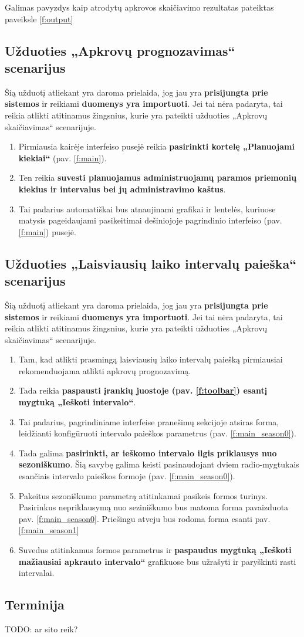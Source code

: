 Galimas pavyzdys kaip atrodytų apkrovos skaičiavimo rezultatas pateiktas paveiksle \ref{f:output}

\subsection{Užduoties „Apkrovų prognozavimas“ scenarijus}
Šią užduotį atliekant yra daroma prielaida, jog jau yra \textbf{prisijungta prie sistemos} ir reikiami \textbf{duomenys yra importuoti}. Jei tai nėra padaryta, tai reikia atlikti atitinamus žingsnius, kurie yra pateikti užduoties „Apkrovų skaičiavimas“ scenarijuje.

\begin{enumerate}
  \item Pirmiausia kairėje interfeiso pusejė reikia \textbf{pasirinkti kortelę „Planuojami kiekiai“} (pav. \ref{f:main}).
  \item Ten reikia \textbf{suvesti planuojamus administruojamų paramos priemonių kiekius ir intervalus bei jų administravimo kaštus}.
  \item Tai padarius automatiškai bus atnaujinami grafikai ir lentelės, kuriuose matysis pageidaujami pasikeitimai dešiniojoje pagrindinio interfeiso (pav. \ref{f:main}) pusejė.
\end{enumerate}


\subsection{Užduoties „Laisviausių laiko intervalų paieška“ scenarijus}
Šią užduotį atliekant yra daroma prielaida, jog jau yra \textbf{prisijungta prie sistemos} ir reikiami \textbf{duomenys yra importuoti}. Jei tai nėra padaryta, tai reikia atlikti atitinamus žingsnius, kurie yra pateikti užduoties „Apkrovų skaičiavimas“ scenarijuje.

\begin{enumerate}
  \item Tam, kad atlikti prasmingą laisviausių laiko intervalų paiešką pirmiausiai rekomenduojama atlikti apkrovų prognozavimą.
  \item Tada reikia \textbf{paspausti įrankių juostoje (pav. \ref{f:toolbar}) esantį mygtuką „Ieškoti intervalo“}.
  \item Tai padarius, pagrindiniame interfeise pranešimų sekcijoje atsiras forma, leidžianti konfigūruoti intervalo paieškos parametrus (pav. \ref{f:main_season0}).
  \item Tada galima \textbf{pasirinkti, ar ieškomo intervalo ilgis priklausys nuo sezoniškumo}. Šią savybę galima keisti pasinaudojant dviem radio-mygtukais esančiais intervalo paieškos formoje (pav. \ref{f:main_season0}).
  \item Pakeitus sezoniškumo parametrą atitinkamai pasikeis formos turinys. Pasirinkus nepriklausymą nuo seziniškumo bus matoma forma pavaizduota pav. \ref{f:main_season0}. Priešingu atveju bus rodoma forma esanti pav. \ref{f:main_season1}
  \item Suvedus atitinkamus formos parametrus ir \textbf{paspaudus mygtuką „Ieškoti mažiausiai apkrauto intervalo“} grafikuose bus užrašyti ir paryškinti rasti intervalai.
\end{enumerate}


\subsection{Terminija}
TODO: ar sito reik?
